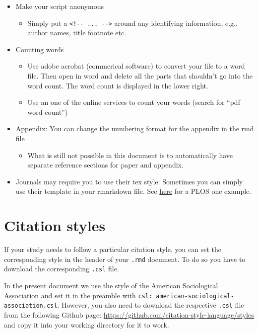 \documentclass[
  12pt,
]{article}
\providecommand{\tightlist}{%
  \setlength{\itemsep}{0pt}\setlength{\parskip}{0pt}}
\begin{document}
\begin{itemize}
\tightlist
\item
  Make your script anonymous

  \begin{itemize}
  \tightlist
  \item
    Simply put a \texttt{\textless{}!-\/-\ ...\ -\/-\textgreater{}}
    around any identifying information, e.g., author names, title
    footnote etc.
  \end{itemize}
\item
  Counting words

  \begin{itemize}
  \tightlist
  \item
    Use adobe acrobat (commerical software) to convert your file to a
    word file. Then open in word and delete all the parts that shouldn't
    go into the word count. The word count is displayed in the lower
    right.
  \item
    Use an one of the online services to count your words (search for
    ``pdf word count'')
  \end{itemize}
\item
  Appendix: You can change the numbering format for the appendix in the
  rmd file

  \begin{itemize}
  \tightlist
  \item
    What is still not possible in this document is to automatically have
    separate reference sections for paper and appendix.
  \end{itemize}
\item
  Journals may require you to use their tex style: Sometimes you can
  simply use their template in your rmarkdown file. See
  \href{https://dataverse.harvard.edu/dataset.xhtml?persistentId=doi:10.7910/DVN/LDUMNY}{here}
  for a PLOS one example.
\end{itemize}

\hypertarget{citation-styles}{%
\section{Citation styles}\label{citation-styles}}

If your study needs to follow a particular citation style, you can set
the corresponding style in the header of your \texttt{.rmd} document. To
do so you have to download the corresponding \texttt{.csl} file.

In the present document we use the style of the American Sociological
Association and set it in the preamble with
\texttt{csl:\ american-sociological-association.csl}. However, you also
need to download the respective \texttt{.csl} file from the following
Github page: \url{https://github.com/citation-style-language/styles} and
copy it into your working directory for it to work.
\end{document}
